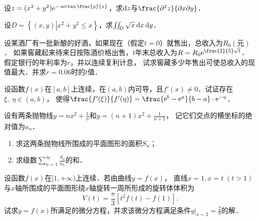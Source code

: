 \documentclass[plain,noanswer,medmath]{../../template/jnuexam}
\begin{document}

\begin{problem}
设$z = (x^2 + y^2)\e^{- \arctan \frac{y}{x}}$，求$\mathop{}\!\mathrm{d} z$与$\frac{\pd^2 z}{\pdx\pd y}$．
\end{problem}



\begin{problem}
设$D = \left\{\left(x,y \right)\left| x^2 + y^2 \le x \right. \right\}$，求$\iint_D \sqrt{x} \mathop{}\!\mathrm{d} x\mathop{}\!\mathrm{d} y$．
\end{problem}



\begin{problem}
设某酒厂有一批新酿的好酒，如果现在（假定$t = 0$）就售出，总收入为$R_0(\text{元})$．
如果窖藏起来待来日按陈酒价格出售，$t$年末总收入为$R = R_0\e^{\frac{2}{5}\sqrt{t}}$．
假定银行的年利率为$r$，并以连续复利计息，
试求窖藏多少年售出可使总收入的现值最大．并求$r = 0.06$时的$t$值．
\end{problem}



\begin{problem}
设函数$f(x)$在$[a,b]$上连续，在$(a,b)$内可导，且$f'(x) \ne 0$．试证存在$\xi,\;\eta\in(a,b)$，
使得$\frac{f'(\xi)}{f'(\eta)} = \frac{\e^b - \e^a}{b - a} \cdot \e^{- \eta}$．
\end{problem}



\begin{problem}
设有两条抛物线$y = nx^2 + \frac{1}{n}$和$y = (n + 1)x^2 + \frac{1}{n + 1}$，
记它们交点的横坐标的绝对值为$a_n$．
\begin{enumerate}
\item 求这两条抛物线所围成的平面图形的面积$S_n$；
\item 求级数$\sum_{n = 1}^{\infty}\frac{S_n}{a_n}$的和．
\end{enumerate}
\end{problem}



\begin{problem}
设函数$f(x)$在$[1, +\infty)$上连续．若由曲线$y = f(x)$，
直线$x = 1,x = t\;(t > 1)$与$x$轴所围成的平面图形绕$x$轴旋转一周所形成的旋转体体积为
$$V(t) = \frac{\pi}{3}\left[t^2 f(t) - f(1) \right].$$
试求$y = f(x)$所满足的微分方程，并求该微分方程满足条件$y\big|_{x = 2} = \frac{2}{9}$的解．
\end{problem}
\end{document}
